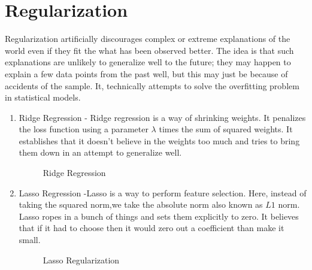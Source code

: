 \documentclass{article}
\begin{document}
\section{Regularization}
Regularization artificially discourages complex or extreme explanations of the world even if they fit the what has been observed better. The idea is that such explanations are unlikely to generalize well to the future; they may happen to explain a few data points from the past well, but this may just be because of accidents of the sample. It, technically attempts to solve the overfitting problem in statistical models.

\begin{enumerate}
\item{Ridge Regression -  Ridge regression is a way of shrinking weights. It penalizes the loss function using a parameter $\lambda$ times the sum of squared weights. It establishes that it doesn't believe in the weights too much and tries to bring them down in an attempt to generalize well. }
 \begin{figure}[h]
\centering
\caption{Ridge Regression}
{\setlength{\fboxsep}{20pt}
\setlength{\fboxrule}{1pt}
\textcolor{Magenta}{}
}
\end{figure} 
 
\newpage
\item{Lasso Regression -Lasso is a way to perform feature selection. Here, instead of taking the squared norm,we take the absolute norm also known as $L1$ norm. Lasso ropes in a bunch of things and sets them explicitly to zero. It believes that if it had to choose then it would zero out a coefficient than make it small. 
}

 \begin{figure}[h]
\centering
\caption{Lasso Regularization}
{\setlength{\fboxsep}{20pt}
\setlength{\fboxrule}{1pt}
\textcolor{cyan}{}
}
\end{figure} 
\end{enumerate}


\end{document}
